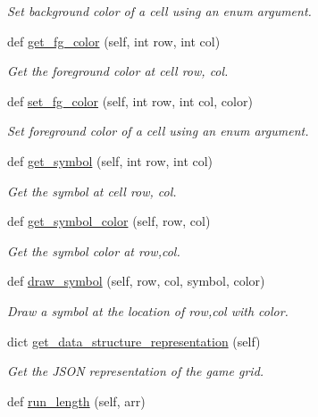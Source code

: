 \begin{DoxyCompactItemize}
\begin{DoxyCompactList}\small\item\em Set background color of a cell using an enum argument. \end{DoxyCompactList}\item 
def \mbox{\hyperlink{classbridges_1_1game__grid_1_1_game_grid_a15d1ca83a190c46c79404cb03ba35fc3}{get\+\_\+fg\+\_\+color}} (self, int row, int col)
\begin{DoxyCompactList}\small\item\em Get the foreground color at cell row, col. \end{DoxyCompactList}\item 
def \mbox{\hyperlink{classbridges_1_1game__grid_1_1_game_grid_a8dd0ee88cadffb4f8645307749120ae7}{set\+\_\+fg\+\_\+color}} (self, int row, int col, color)
\begin{DoxyCompactList}\small\item\em Set foreground color of a cell using an enum argument. \end{DoxyCompactList}\item 
def \mbox{\hyperlink{classbridges_1_1game__grid_1_1_game_grid_a15cac5e46e16ada68b0bfe6eb6ac2609}{get\+\_\+symbol}} (self, int row, int col)
\begin{DoxyCompactList}\small\item\em Get the symbol at cell row, col. \end{DoxyCompactList}\item 
def \mbox{\hyperlink{classbridges_1_1game__grid_1_1_game_grid_a7324c15bc6983621ed84964dde173f7f}{get\+\_\+symbol\+\_\+color}} (self, row, col)
\begin{DoxyCompactList}\small\item\em Get the symbol color at row,col. \end{DoxyCompactList}\item 
def \mbox{\hyperlink{classbridges_1_1game__grid_1_1_game_grid_aa7ce48d090d75c8022a8356aafad303f}{draw\+\_\+symbol}} (self, row, col, symbol, color)
\begin{DoxyCompactList}\small\item\em Draw a symbol at the location of row,col with color. \end{DoxyCompactList}\item 
dict \mbox{\hyperlink{classbridges_1_1game__grid_1_1_game_grid_ac81ba121456b60c2cfe5e96514e78403}{get\+\_\+data\+\_\+structure\+\_\+representation}} (self)
\begin{DoxyCompactList}\small\item\em Get the J\+S\+ON representation of the game grid. \end{DoxyCompactList}\item 
def \mbox{\hyperlink{classbridges_1_1game__grid_1_1_game_grid_a80f0ce020baf3d5fe53cbd719fbe78e5}{run\+\_\+length}} (self, arr)
\end{DoxyCompactItemize}

